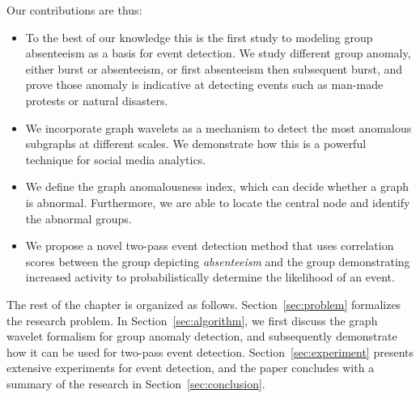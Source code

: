 Our contributions are thus:
\begin{itemize}
\item To the best of our knowledge this is the first study to modeling group absenteeism as a basis for event detection. We study different group anomaly, either burst or absenteeism, or first absenteeism then subsequent burst, and prove those anomaly is indicative at detecting events such as man-made protests or natural disasters.
\item We incorporate graph wavelets as a mechanism to detect the most anomalous subgraphs at different scales. We demonstrate how this is a powerful technique for social media analytics.
\item We define the graph anomalousness index, which can decide whether a graph is abnormal. Furthermore, we are able to locate the central node and identify the abnormal groups.
\item We propose a novel two-pass event detection method that uses correlation scores between the group depicting \textit{absenteeism} and the group demonstrating increased activity to probabilistically determine the likelihood of an event.
\end{itemize}

The rest of the chapter is organized as follows. Section~\ref{sec:problem} formalizes the research problem. In Section~\ref{sec:algorithm}, we first discuss the graph wavelet formalism for group anomaly detection, and subsequently demonstrate how it can be used for two-pass event detection. Section~\ref{sec:experiment} presents extensive experiments for event detection, and the paper concludes with a summary of the research in Section~\ref{sec:conclusion}.

